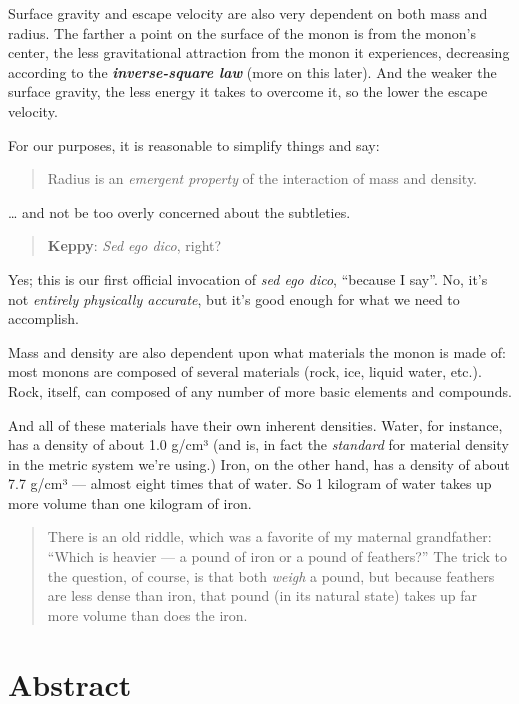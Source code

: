 \documentclass[
  letterpaper,
]{book}
\begin{document}
Surface gravity and escape velocity are also very dependent on both mass
and radius. The farther a point on the surface of the monon is from the
monon's center, the less gravitational attraction from the monon it
experiences, decreasing according to the \textbf{\emph{inverse-square
law}} (more on this later). And the weaker the surface gravity, the less
energy it takes to overcome it, so the lower the escape velocity.

For our purposes, it is reasonable to simplify things and say:

\begin{quote}
Radius is an \emph{emergent property} of the interaction of mass and
density.
\end{quote}

\ldots{} and not be too overly concerned about the subtleties.

\begin{quote}
\textbf{Keppy}: \emph{Sed ego dico}, right?
\end{quote}

Yes; this is our first official invocation of \emph{sed ego dico},
``because I say''. No, it's not \emph{entirely physically accurate}, but
it's good enough for what we need to accomplish.

Mass and density are also dependent upon what materials the monon is
made of: most monons are composed of several materials (rock, ice,
liquid water, etc.). Rock, itself, can composed of any number of more
basic elements and compounds.

And all of these materials have their own inherent densities. Water, for
instance, has a density of about 1.0 g/cm³ (and is, in fact the
\emph{standard} for material density in the metric system we're using.)
Iron, on the other hand, has a density of about 7.7 g/cm³ --- almost
eight times that of water. So 1 kilogram of water takes up more volume
than one kilogram of iron.

\begin{quote}
There is an old riddle, which was a favorite of my maternal grandfather:
``Which is heavier --- a pound of iron or a pound of feathers?'' The
trick to the question, of course, is that both \emph{weigh} a pound, but
because feathers are less dense than iron, that pound (in its natural
state) takes up far more volume than does the iron.
\end{quote}

\section{Abstract}\label{abstract-40}
\end{document}
